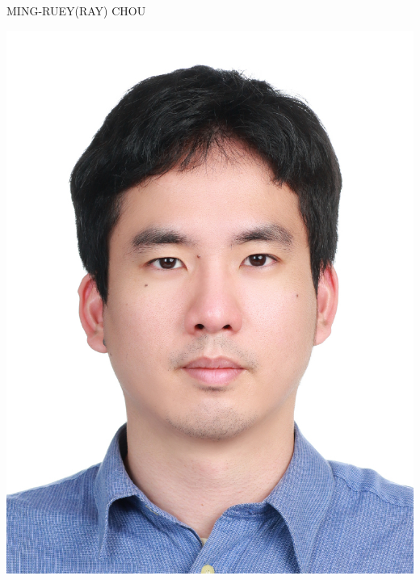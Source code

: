 \documentclass[10pt,A4]{article}
\begin{document}
\pagestyle{fancy}	

\vspace{-8pt}

\begin{minipage}{0.8\textwidth}\flushleft
    \HUGE \textsc{MING-RUEY(RAY) CHOU}\\[2pt]
\end{minipage}
\begin{minipage}{0.2\textwidth}\flushright
    \includegraphics[scale=0.075]{./photo.jpg}
\end{minipage}

\vspace{6pt}
\end{document}
